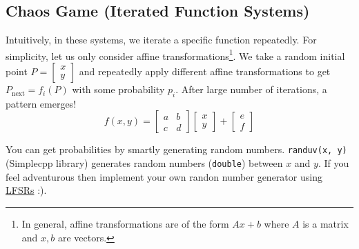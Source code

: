 \recalctypearea
\subsection{Chaos Game (Iterated Function Systems)}
Intuitively, in these systems, we iterate a specific function repeatedly. For simplicity, let us only consider affine transformations\footnote{In general, affine transformations are of the form $Ax+b$ where $A$ is a matrix and $x,b$ are vectors.}. We take a random initial point $P=\begin{bmatrix}x\\y\end{bmatrix}$ and repeatedly apply different affine transformations to get $P_{\text{next}}=f_i(P)$ with some probability $p_i$. After large number of iterations, a pattern emerges!
\begin{equation}
	f(x,y)={\begin{bmatrix}a&b\\c&d\end{bmatrix}}{\begin{bmatrix}x\\y\end{bmatrix}}+{\begin{bmatrix}e\\f\end{bmatrix}}
\end{equation}
\begin{note}
	You can get probabilities by smartly generating random numbers. \verb!randuv(x, y)! (Simplecpp library) generates random numbers (\verb!double!) between $x$ and $y$. If you feel adventurous then implement your own randon number generator using \hyperref[pp:linearfeedbackshiftregister]{LFSRs} :).
\end{note}
